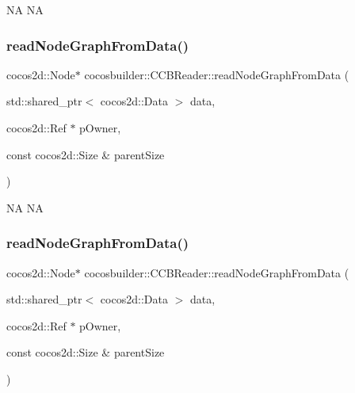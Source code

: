 NA  NA \mbox{\label{classcocosbuilder_1_1CCBReader_afcc34580625ae0cecaf2c00a5607df89}} 
\subsubsection{\texorpdfstring{read\+Node\+Graph\+From\+Data()}{readNodeGraphFromData()}\hspace{0.1cm}{\footnotesize\ttfamily [1/2]}}
{\footnotesize\ttfamily cocos2d\+::\+Node$\ast$ cocosbuilder\+::\+C\+C\+B\+Reader\+::read\+Node\+Graph\+From\+Data (\begin{DoxyParamCaption}\item[{std\+::shared\+\_\+ptr$<$ cocos2d\+::\+Data $>$}]{data,  }\item[{cocos2d\+::\+Ref $\ast$}]{p\+Owner,  }\item[{const cocos2d\+::\+Size \&}]{parent\+Size }\end{DoxyParamCaption})}

NA  NA \mbox{\label{classcocosbuilder_1_1CCBReader_afcc34580625ae0cecaf2c00a5607df89}} 
\subsubsection{\texorpdfstring{read\+Node\+Graph\+From\+Data()}{readNodeGraphFromData()}\hspace{0.1cm}{\footnotesize\ttfamily [2/2]}}
{\footnotesize\ttfamily cocos2d\+::\+Node$\ast$ cocosbuilder\+::\+C\+C\+B\+Reader\+::read\+Node\+Graph\+From\+Data (\begin{DoxyParamCaption}\item[{std\+::shared\+\_\+ptr$<$ cocos2d\+::\+Data $>$}]{data,  }\item[{cocos2d\+::\+Ref $\ast$}]{p\+Owner,  }\item[{const cocos2d\+::\+Size \&}]{parent\+Size }\end{DoxyParamCaption})}

